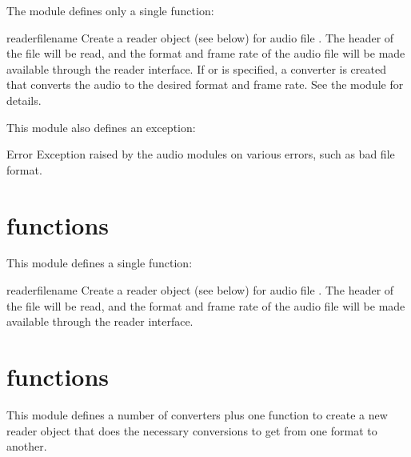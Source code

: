 The  module defines only a single function:

\begin{funcdesc}{reader}{filename}
Create a reader object (see below) for audio file .  The
header of the file will be read, and the format and frame rate of the
audio file will be made available through the reader interface.  If
 or  is specified, a converter is created that
converts the audio to the desired format and frame rate.  See the
 module for details.
\end{funcdesc}

This module also defines an exception:

\begin{excdesc}{Error}
Exception raised by the audio modules on various errors, such as bad
file format.
\end{excdesc}

\section{ functions}

This module defines a single function:

\begin{funcdesc}{reader}{filename}
Create a reader object (see below) for audio file .  The
header of the file will be read, and the format and frame rate of the
audio file will be made available through the reader interface.
\end{funcdesc}

\section{ functions}

This module defines a number of converters plus one function to create
a new reader object that does the necessary conversions to get from
one format to another.

